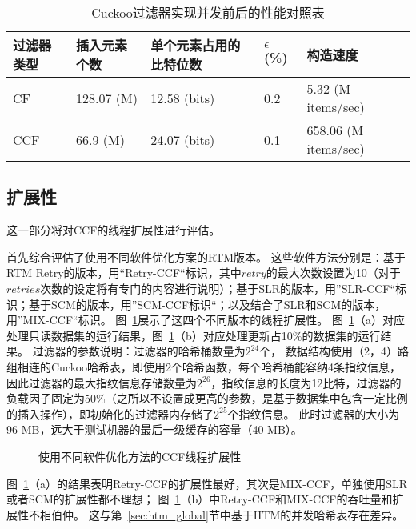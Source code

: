 \begin{table}[htbp]
  \centering
  \caption{Cuckoo过滤器实现并发前后的性能对照表}
  \label{tab:cf_space}
  \begin{tabular}{lllll}
    \toprule
      过滤器类型  & 插入元素个数 & 单个元素占用的比特位数 & $\epsilon$ (\%) &  构造速度  \\
    \midrule
      CF   &  128.07 (M) & 12.58 (bits) &  0.2       &  5.32 (M items/sec)  \\
      CCF  &  66.9 (M)  & 24.07 (bits)  &  0.1       &  658.06 (M items/sec) \\
    \bottomrule
  \end{tabular}
\end{table}

\subsection{扩展性}
这一部分将对CCF的线程扩展性进行评估。

首先综合评估了使用不同软件优化方案的RTM版本。
这些软件方法分别是：基于RTM Retry的版本，用“Retry-CCF“标识，其中$retry$的最大次数设置为10（对于$retries$次数的设定将有专门的内容进行说明）；基于SLR的版本，用”SLR-CCF“标识；基于SCM的版本，用”SCM-CCF标识“；以及结合了SLR和SCM的版本，用”MIX-CCF“标识。
图~\ref{fig:cf-locks}展示了这四个不同版本的线程扩展性。
图~\ref{fig:cf-locks}（a）对应处理只读数据集的运行结果，图~\ref{fig:cf-locks}（b）对应处理更新占10\%的数据集的运行结果。
过滤器的参数说明：过滤器的哈希桶数量为$2^{24}$个，
数据结构使用（2，4）路组相连的Cuckoo哈希表，即使用2个哈希函数，每个哈希桶能容纳4条指纹信息，因此过滤器的最大指纹信息存储数量为$2^{26}$，指纹信息的长度为12比特，过滤器的负载因子固定为50\%（之所以不设置成更高的参数，是基于数据集中包含一定比例的插入操作），即初始化的过滤器内存储了$2^{25}$个指纹信息。
此时过滤器的大小为96 MB，远大于测试机器的最后一级缓存的容量（40 MB）。

\begin{figure}[htbp]
\centering
\caption{使用不同软件优化方法的CCF线程扩展性}
\label{fig:cf-locks}
\end{figure}
图~\ref{fig:cf-locks}（a）的结果表明Retry-CCF的扩展性最好，其次是MIX-CCF，单独使用SLR或者SCM的扩展性都不理想；
图~\ref{fig:cf-locks}（b）中Retry-CCF和MIX-CCF的吞吐量和扩展性不相伯仲。
这与第~\ref{sec:htm_global}节中基于HTM的并发哈希表存在差异。

